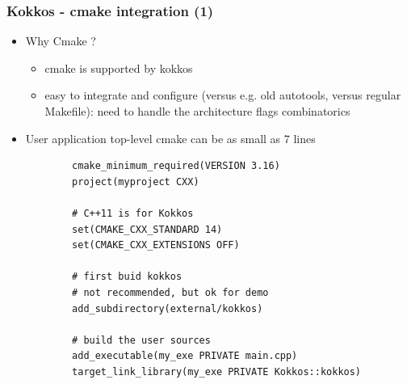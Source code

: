 \begin{frame}[fragile=singleslide]
  \frametitle{Kokkos - cmake integration (1)}

  \begin{itemize}
  \item Why Cmake ?
    \begin{itemize}
    \item cmake is supported by kokkos
    \item easy to integrate and configure (versus e.g. old autotools, versus regular Makefile): need to handle the architecture flags combinatorics
    \end{itemize}
  \item User application top-level cmake can be as small as 7 lines
    {\small
      \begin{verbatim}
        cmake_minimum_required(VERSION 3.16)
        project(myproject CXX)

        # C++11 is for Kokkos
        set(CMAKE_CXX_STANDARD 14)
        set(CMAKE_CXX_EXTENSIONS OFF)

        # first buid kokkos
        # not recommended, but ok for demo
        add_subdirectory(external/kokkos)

        # build the user sources
        add_executable(my_exe PRIVATE main.cpp)
        target_link_library(my_exe PRIVATE Kokkos::kokkos)
      \end{verbatim}
      }
  \end{itemize}

\end{frame}

